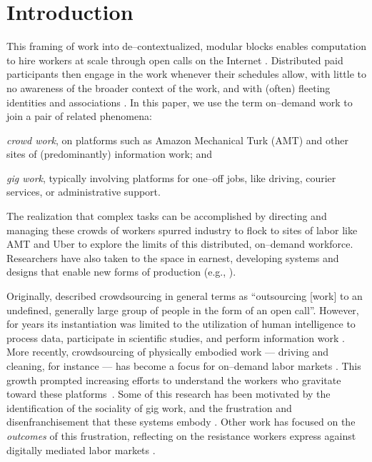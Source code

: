 \documentclass[trackingWork]{subfiles}
\begin{document}
\section{Introduction}\label{sec:introduction}

This framing of work into de--contextualized, modular blocks
enables computation to hire workers at scale through open calls on the Internet
\cite{howe2008crowdsourcing,Bigham2014,crowdworkFuture}.
Distributed paid participants then engage in the work whenever their schedules allow,
with little to no awareness of the broader context of the work, and 
with (often) fleeting identities and associations
\cite{martin2014being,uberAlgorithm}.
In this paper, we use the term on--demand work to join a pair of related phenomena:
\begin{inlinelist}
\item \textit{crowd work}, on platforms such as Amazon Mechanical Turk (AMT) and other sites of (predominantly) information work; and
\item \textit{gig work}, typically involving platforms for one--off jobs, like driving, courier services, or administrative support.
\end{inlinelist}
The realization that complex tasks can be accomplished by directing and managing these crowds of workers spurred industry to flock to sites of labor
like AMT and Uber to explore the limits of this distributed, on--demand workforce.
Researchers have also taken to the space in earnest,
developing systems and designs that enable new forms of production
(e.g., \cite{bernsteinSoylent,vizwiz,paolacci2010running}).

Originally, \citeauthor{howe2008crowdsourcing} described crowdsourcing in general terms as
``outsourcing [work] to an undefined, generally large group of people in the form of an open call''.
However, for years its instantiation was limited to the utilization of
human intelligence to process data, participate in scientific studies, and perform information work
\cite{CrowdsourcingUserStudies,movieSummarizationWu,
      yuenSurvey,geiger2011managing,quinnbedersonTaxonomy}.
More recently, crowdsourcing of physically embodied work
--- driving and cleaning, for instance ---
has become a focus for on--demand labor markets
\cite{uberAlgorithm,uberOfficial,zaarlyOfficial,taskrabbitOfficial}.
This growth prompted increasing efforts to understand the workers who gravitate toward these platforms~\cite{Ross,whoareNOTtheTurkers}.
Some of this research has been motivated by the identification of the sociality of gig work,
and the frustration and disenfranchisement that these systems embody
\cite{turkopticon,martin2014being,takingAHITMcInnis}.
Other work has focused on the \textit{outcomes} of this frustration,
reflecting on the resistance workers express against digitally mediated labor markets
\cite{uberAlgorithm,dynamo}.
\end{document}
